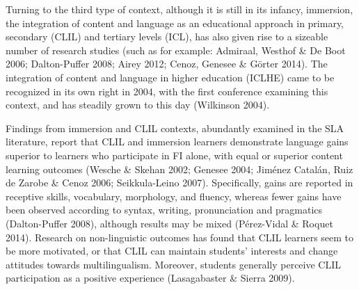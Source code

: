 \begin{styleStandard}
Turning to the third type of context, although it is still in its infancy, immersion, the integration of content and language as an educational approach in primary, secondary (CLIL) and tertiary levels (ICL), has also given rise to a sizeable number of research studies (such as for example: Admiraal, Westhof \& De Boot 2006; Dalton-Puffer 2008; Airey 2012; Cenoz, Genesee \& Görter 2014). The integration of content and language in higher education (ICLHE) came to be recognized in its own right in 2004, with the first conference examining this context, and has steadily grown to this day (Wilkinson 2004). 
\end{styleStandard}

\begin{styleStandard}
Findings from immersion and CLIL contexts, abundantly examined in the SLA literature, report that CLIL and immersion learners demonstrate language gains superior to learners who participate in FI alone, with equal or superior content learning outcomes (Wesche \& Skehan 2002; Genesee 2004; Jiménez Catalán, Ruiz de Zarobe \& Cenoz 2006; Seikkula-Leino 2007). Specifically, gains are reported in receptive skills, vocabulary, morphology, and fluency, whereas fewer gains have been observed according to syntax, writing, pronunciation and pragmatics (Dalton-Puffer 2008), although results may be mixed (Pérez-Vidal \& Roquet 2014). Research on non-linguistic outcomes has found that CLIL learners seem to be more motivated, or that CLIL can maintain students’ interests and change attitudes towards multilingualism. Moreover, students generally perceive CLIL participation as a positive experience (Lasagabaster \& Sierra 2009). 
\end{styleStandard}

